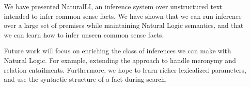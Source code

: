 We have presented NaturalLI, an inference system over
  unstructured text intended to infer common sense facts.
We have shown that we can run inference over a large set of premises
  while maintaining Natural Logic semantics, and that
  we can learn how to infer unseen common sense facts.

Future work will focus on enriching the class of inferences we can
  make with Natural Logic.
For example, extending the approach to handle meronymy and
  relation entailments.
Furthermore, we hope to learn richer lexicalized parameters,
  and use the syntactic structure of a fact during search.
